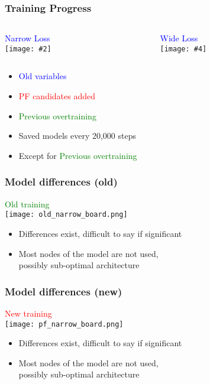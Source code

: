 \documentclass{beamer}
\newcommand{\twofigs}[4]{
  \begin{columns}
    \begin{column}{0.5\linewidth}
      \centering
      \textcolor{blue}{#1} \\
      \texttt{[image: \#2]}
    \end{column}
    \begin{column}{0.5\linewidth}
      \centering
      \textcolor{blue}{#3} \\
      \texttt{[image: \#4]}
    \end{column}
  \end{columns}
}
\begin{document}
\begin{frame}
  \frametitle{Training Progress}

  \twofigs{Narrow Loss}
          {190611/plot_narrow.pdf}
          {Wide Loss}
          {190611/plot_wide.pdf}

  \begin{itemize}
  \item \textcolor{blue}{Old variables}
  \item \textcolor{red}{PF candidates added}
  \item \textcolor{green}{Previous overtraining}
  \end{itemize}

  \begin{itemize}
  \item Saved models every 20,000 steps
  \item Except for \textcolor{green}{Previous overtraining}
  \end{itemize}

\end{frame}

\begin{frame}
  \frametitle{Model differences (old)}

  \begin{center}
    \textcolor{green}{Old training} \\
    \texttt{[image: old\_narrow\_board.png]} \\
  \end{center}

  \begin{itemize}
  \item Differences exist, difficult to say if significant
  \item Most nodes of the model are not used, \\
    possibly sub-optimal architecture
  \end{itemize}

\end{frame}

\begin{frame}
  \frametitle{Model differences (new)}

  \begin{center}
    \textcolor{red}{New training} \\
    \texttt{[image: pf\_narrow\_board.png]} \\
  \end{center}

  \begin{itemize}
  \item Differences exist, difficult to say if significant
  \item Most nodes of the model are not used, \\
    possibly sub-optimal architecture
  \end{itemize}

\end{frame}
\end{document}
